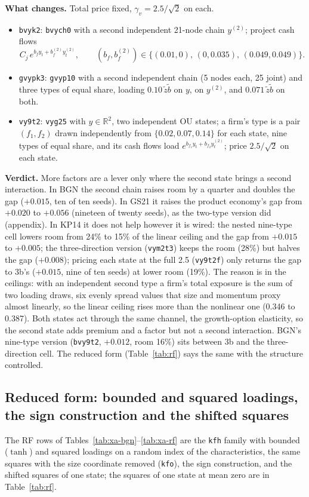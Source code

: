 \documentclass[11pt]{article}
\begin{document}
\noindent\textbf{What changes.} Total price fixed, $\gamma_v=2.5/\sqrt2$ on each.
\begin{itemize}
  \item \texttt{bvyk2}: \texttt{bvych0} with a second independent 21-node chain $y^{(2)}$; project cash flows \[C_j\,e^{b_f y_t+b_f^{(2)}y^{(2)}_t},\qquad (b_f,b_f^{(2)})\in\{(0.01,0),\,(0,0.035),\,(0.049,0.049)\}.\]
  \item \texttt{gvypk3}: \texttt{gvyp10} with a second independent chain (5 nodes each, 25 joint) and three types of equal share, loading $0.10\,\tilde z\tilde b$ on $y$, on $y^{(2)}$, and $0.071\,\tilde z\tilde b$ on both.
  \item \texttt{vy9t2}: \texttt{vyg25} with $y\in\mathbb{R}^2$, two independent OU states; a firm's type is a pair $(f_1,f_2)$ drawn independently from $\{0.02,0.07,0.14\}$ for each state, nine types of equal share, and its cash flows load $e^{b_{f_1}y_t+b_{f_2}y^{(2)}_t}$; price $2.5/\sqrt2$ on each state.
\end{itemize}


\noindent\textbf{Verdict.} More factors are a lever only where the second state brings a second interaction. In BGN the second chain raises room by a quarter and doubles the gap ($+0.015$, ten of ten seeds). In GS21 it raises the product economy's gap from $+0.020$ to $+0.056$ (nineteen of twenty seeds), as the two-type version did (appendix). In KP14 it does not help however it is wired: the nested nine-type cell lowers room from 24\% to 15\% of the linear ceiling and the gap from $+0.015$ to $+0.005$; the three-direction version (\texttt{vym2t3}) keeps the room (28\%) but halves the gap ($+0.008$); pricing each state at the full 2.5 (\texttt{vy9t2f}) only returns the gap to 3b's ($+0.015$, nine of ten seeds) at lower room (19\%). The reason is in the ceilings: with an independent second type a firm's total exposure is the sum of two loading draws, six evenly spread values that size and momentum proxy almost linearly, so the linear ceiling rises more than the nonlinear one (0.346 to 0.387). Both states act through the same channel, the growth-option elasticity, so the second state adds premium and a factor but not a second interaction. BGN's nine-type version (\texttt{bvy9t2}, $+0.012$, room 16\%) sits between 3b and the three-direction cell. The reduced form (Table~\ref{tab:rf}) says the same with the structure controlled.

\subsection*{Reduced form: bounded and squared loadings, the sign construction and the shifted squares}
The RF rows of Tables~\ref{tab:xa-bgn}--\ref{tab:xa-rf} are the \texttt{kfh} family with bounded ($\tanh$) and squared loadings on a random index of the characteristics, the same squares with the size coordinate removed (\texttt{kfo}), the sign construction, and the shifted squares of one state; the squares of one state at mean zero are in Table~\ref{tab:rf}.
\end{document}
